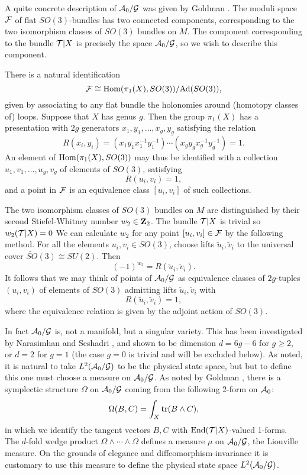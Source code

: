 \documentclass[12pt]{article}
\newcommand\Hom{{\rm Hom}}
\newcommand{\Om}{\Omega}
\newcommand{\A}{{\cal A}}
\newcommand{\G}{{\cal G}}
\newcommand{\F}{{\cal F}}
\newcommand{\T}{{\cal T}}
\newcommand{\Z}{{\bf Z}}
\newcommand{\Ad}{{\rm Ad}}
\newcommand{\tr}{{\rm tr}}
\newcommand{\End}{{\rm End}}
\begin{document}
A quite concrete description of $\A_0/\G$ was given by Goldman
\cite{Goldman}.  The moduli space $\F$ of flat $SO(3)$-bundles
has two connected components,
corresponding to the two isomorphism classes of $SO(3)$ bundles on
$M$.  The component corresponding to the bundle $\T|X$ is precisely the space
$\A_0/\G$, so we wish to describe this component.

There is a natural identification
\[        \F \cong  \Hom(\pi_1(X),SO(3))/\Ad(SO(3)), \]
given by associating to any flat bundle the holonomies around
(homotopy classes of) loops.  Suppose that $X$ has
genus $g$.  Then the group $\pi_1(X)$ has a
presentation with $2g$ generators $x_1,y_1, \dots, x_g,y_g$ satisfying
the relation
\[    R(x_i,y_i) = (x_1y_1x_1^{-1}y_1^{-1}) \cdots
(x_gy_gx_g^{-1}y_g^{-1}) = 1 .\]
An element of $\Hom(\pi_1(X), SO(3))$ may thus be identified with
a collection \break
$u_1,v_1, \dots, u_g,v_g$ of elements of $SO(3)$, satisfying
\[    R(u_i,v_i) = 1 ,\]
and a point in $\F$ is an equivalence class $[u_i, v_i]$ of such collections.

The two isomorphism classes of $SO(3)$ bundles on $M$ are
distinguished by their second Stiefel-Whitney number $w_2 \in \Z_2$.
The bundle $\T|X$ is trivial so $w_2(\T|X) = 0$
We can calculate $w_2$ for any point $[u_i, v_i] \in \F$ by the
following method.  For all the elements $u_i, v_i \in SO(3)$, choose lifts
$\tilde u_i, \tilde v_i$ to the universal cover $\widetilde{SO}(3) \cong
SU(2)$.  Then
\[     (-1)^{w_2} = R(\tilde u_i ,\tilde v_i) .\]
It follows that we may think of points of $\A_0/\G$
as equivalence classes of $2g$-tuples
$(u_i,v_i)$ of elements of $SO(3)$ admitting lifts $\tilde u_i, \tilde
v_i$ with
\[     R(\tilde u_i, \tilde v_i) = 1,\]
where the equivalence relation is given by the adjoint action of $SO(3)$.

In fact $\A_0/\G$ is, not a manifold, but a singular variety.
This has been investigated by Narasimhan and Seshadri \cite{NS}, and
shown to be
dimension $d = 6g - 6$ for $g \ge 2$, or $d = 2$ for $g = 1$ (the case
$g = 0$ is trivial and will be excluded below).
As noted,
it is natural to take $L^2(\A_0/\G)$ to be the physical state space, but
but to define this one must choose a measure on $\A_0/\G$.
As noted by Goldman \cite{Goldman}, there is a symplectic structure
$\Om$ on $\A_0/\G$ coming from the following 2-form on $\A_0$:
\[         \Om(B,C) = \int_X \tr(B \wedge C),  \]
in which we identify the tangent vectors $B,C$ with $\End(\T|X)$-valued
1-forms.   The $d$-fold wedge product $\Om \wedge \cdots \wedge \Om$
defines a measure $\mu$ on $\A_0/\G$, the Liouville measure.
On the grounds of elegance and diffeomorphism-invariance
it is customary to use this
measure to define the physical state space $L^2(\A_0/\G)$.
\end{document}
